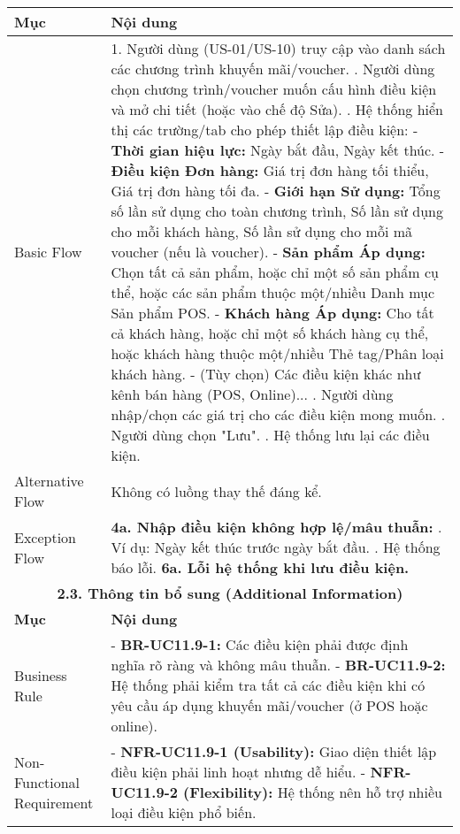 \begin{longtable}{|m{4cm}|p{11cm}|}
\hline
\textbf{Mục} & \textbf{Nội dung} \\
\hline
Basic Flow & 1. Người dùng (US-01/US-10) truy cập vào danh sách các chương trình khuyến mãi/voucher. \newline 2. Người dùng chọn chương trình/voucher muốn cấu hình điều kiện và mở chi tiết (hoặc vào chế độ Sửa). \newline 3. Hệ thống hiển thị các trường/tab cho phép thiết lập điều kiện: \newline    - \textbf{Thời gian hiệu lực:} Ngày bắt đầu, Ngày kết thúc. \newline    - \textbf{Điều kiện Đơn hàng:} Giá trị đơn hàng tối thiểu, Giá trị đơn hàng tối đa. \newline    - \textbf{Giới hạn Sử dụng:} Tổng số lần sử dụng cho toàn chương trình, Số lần sử dụng cho mỗi khách hàng, Số lần sử dụng cho mỗi mã voucher (nếu là voucher). \newline    - \textbf{Sản phẩm Áp dụng:} Chọn tất cả sản phẩm, hoặc chỉ một số sản phẩm cụ thể, hoặc các sản phẩm thuộc một/nhiều Danh mục Sản phẩm POS. \newline    - \textbf{Khách hàng Áp dụng:} Cho tất cả khách hàng, hoặc chỉ một số khách hàng cụ thể, hoặc khách hàng thuộc một/nhiều Thẻ tag/Phân loại khách hàng. \newline    - (Tùy chọn) Các điều kiện khác như kênh bán hàng (POS, Online)... \newline 4. Người dùng nhập/chọn các giá trị cho các điều kiện mong muốn. \newline 5. Người dùng chọn "Lưu". \newline 6. Hệ thống lưu lại các điều kiện. \\
\hline
Alternative Flow & Không có luồng thay thế đáng kể. \\
\hline
Exception Flow & \textbf{4a. Nhập điều kiện không hợp lệ/mâu thuẫn:} \newline    1. Ví dụ: Ngày kết thúc trước ngày bắt đầu. \newline    2. Hệ thống báo lỗi. \newline \textbf{6a. Lỗi hệ thống khi lưu điều kiện.} \\
\hline
\multicolumn{2}{|c|}{\textbf{2.3. Thông tin bổ sung (Additional Information)}} \\
\hline
\textbf{Mục} & \textbf{Nội dung} \\
\hline
Business Rule & - \textbf{BR-UC11.9-1:} Các điều kiện phải được định nghĩa rõ ràng và không mâu thuẫn. \newline - \textbf{BR-UC11.9-2:} Hệ thống phải kiểm tra tất cả các điều kiện khi có yêu cầu áp dụng khuyến mãi/voucher (ở POS hoặc online). \\
\hline
Non-Functional Requirement & - \textbf{NFR-UC11.9-1 (Usability):} Giao diện thiết lập điều kiện phải linh hoạt nhưng dễ hiểu. \newline - \textbf{NFR-UC11.9-2 (Flexibility):} Hệ thống nên hỗ trợ nhiều loại điều kiện phổ biến. \\
\hline
\end{longtable}

